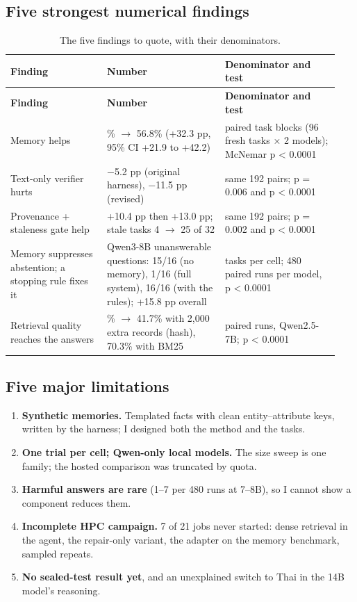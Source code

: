 \documentclass[10pt,a4paper]{article}
\begin{document}
\subsection*{Five strongest numerical findings}
\begingroup\small\setlength{\tabcolsep}{4pt}\renewcommand{\arraystretch}{1.18}
\begin{longtable}{>{\raggedright\arraybackslash}p{0.277\linewidth}>{\raggedright\arraybackslash}p{0.336\linewidth}>{\raggedright\arraybackslash}p{0.327\linewidth}}
\caption{The five findings to quote, with their denominators.}\\
\toprule
\textbf{Finding} & \textbf{Number} & \textbf{Denominator and test} \\
\midrule
\endfirsthead
\toprule
\textbf{Finding} & \textbf{Number} & \textbf{Denominator and test} \\
\midrule
\endhead
\bottomrule
\endlastfoot
Memory helps & 24.5\% $\rightarrow$ 56.8\% (+32.3 pp, 95\% CI +21.9 to +42.2) & 192 paired task blocks (96 fresh tasks × 2 models); McNemar p < 0.0001 \\
Text-only verifier hurts & −5.2 pp (original harness), −11.5 pp (revised) & same 192 pairs; p = 0.006 and p < 0.0001 \\
Provenance + staleness gate help & +10.4 pp then +13.0 pp; stale tasks 4 $\rightarrow$ 25 of 32 & same 192 pairs; p = 0.002 and p < 0.0001 \\
Memory suppresses abstention; a stopping rule fixes it & Qwen3-8B unanswerable questions: 15/16 (no memory), 1/16 (full system), 16/16 (with the rules); +15.8 pp overall & 16 tasks per cell; 480 paired runs per model, p < 0.0001 \\
Retrieval quality reaches the answers & 71.4\% $\rightarrow$ 41.7\% with 2,000 extra records (hash), 70.3\% with BM25 & 192 paired runs, Qwen2.5-7B; p < 0.0001 \\
\end{longtable}
\endgroup

\subsection*{Five major limitations}
\begin{enumerate}
\item \textbf{Synthetic memories.} Templated facts with clean entity–attribute keys, written by the harness; I designed both the method and the tasks.
\item \textbf{One trial per cell; Qwen-only local models.} The size sweep is one family; the hosted comparison was truncated by quota.
\item \textbf{Harmful answers are rare} (1–7 per 480 runs at 7–8B), so I cannot show a component reduces them.
\item \textbf{Incomplete HPC campaign.} 7 of 21 jobs never started: dense retrieval in the agent, the repair-only variant, the adapter on the memory benchmark, sampled repeats.
\item \textbf{No sealed-test result yet}, and an unexplained switch to Thai in the 14B model's reasoning.
\end{enumerate}
\end{document}
